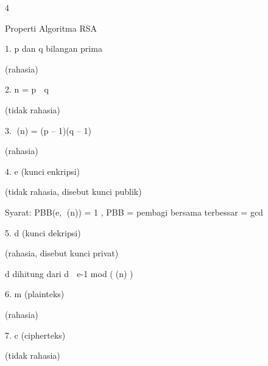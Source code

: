 \documentclass{article}
\begin{document}

4

Properti Algoritma RSA

1.   p dan q bilangan prima 


(rahasia)

2.   n = p  q 




(tidak rahasia)

3.   (n) = (p – 1)(q – 1) 


(rahasia)

4.   e     (kunci enkripsi) 


(tidak rahasia, disebut kunci publik)

     Syarat: PBB(e, (n)) = 1   , PBB = pembagi bersama terbessar = gcd

5.  d     (kunci dekripsi) 


(rahasia, disebut kunci privat)

     d    dihitung dari d  e-1 mod ((n) )

6.  m    (plainteks) 



(rahasia)

7.  c    (cipherteks) 



(tidak rahasia)
\end{document}
